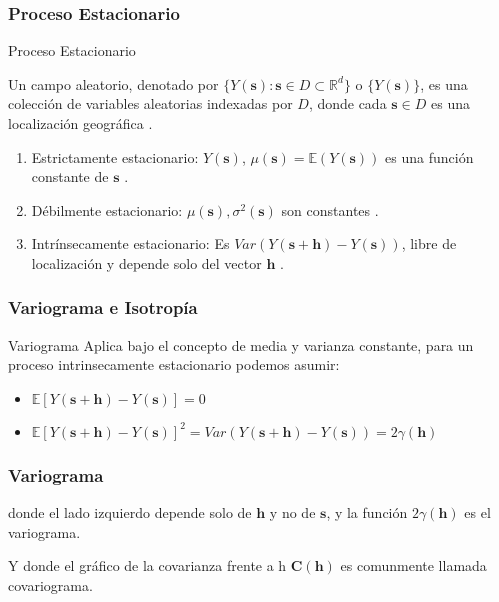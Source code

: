 
\subsubsection{Proceso Estacionario}
\begin{frame}{Proceso Estacionario}

Un campo aleatorio, denotado por ${\{Y(\mathbf{s}) : \mathbf{s} \in D \subset \mathbb{R}^d\}}$ o ${\{Y(\mathbf{s})\}}$, es una colecci\'on de variables aleatorias indexadas por $D$, donde cada $\mathbf{s} \in D$ es una localizaci\'on geogr\'afica \cite{Cressie1993}.

\vspace{\baselineskip}
\begin{enumerate}
        \item Estrictamente estacionario: $Y(\mathbf{s})$, $\mu(\mathbf{s}) = \mathbb{E}(Y(\mathbf{s}))$  es una funci\'on constante de $\mathbf{s}$ \cite{Banerjee2015}.
        \item D\'ebilmente estacionario: $\mu(\mathbf{s}), \sigma^{2}(\mathbf{s})$ son constantes \cite{Schaenberger2005}.
        \item Intr\'insecamente estacionario: Es $Var(Y(\mathbf{s+h}) - Y(\mathbf{s}))$, libre de localizaci\'on y depende solo del vector $\mathbf{h}$ \cite{Sujit2022}.
\end{enumerate}

\end{frame}
\subsubsection{Variograma e Isotrop\'ia}
\begin{frame}{Variograma}
Aplica bajo el concepto de media y varianza constante, para un  proceso intrinsecamente estacionario podemos asumir: \vspace{\baselineskip}
\begin{itemize}
    \item $\mathbb{E}[Y\mathbf{(s + h)} - Y\mathbf{(s)}] = 0$
    \item $\mathbb{E}[Y\mathbf{(s + h)} - Y(\mathbf{s})]^2 = Var(Y\mathbf{(s+h)} - Y\mathbf{(s)}) = 2\gamma(\mathbf{h})$
\end{itemize}
\vspace{\baselineskip}
\subsubsection{Variograma}

donde el lado izquierdo depende solo de $\mathbf{h}$ y no de $\mathbf{s}$, y la funci\'on $2\gamma(\mathbf{h})$ es el variograma.\vspace{\baselineskip}

Y donde el gr\'afico de la covarianza frente a h $\mathbf{C(h)}$ es comunmente llamada covariograma.

\end{frame}
